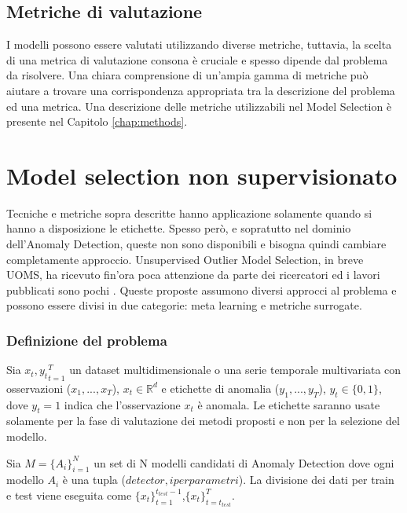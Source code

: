 \subsection{Metriche di valutazione}
I modelli possono essere valutati utilizzando diverse metriche, tuttavia, la scelta di una metrica di valutazione consona è cruciale e spesso dipende dal problema da risolvere. Una chiara comprensione di un'ampia gamma di metriche può aiutare a trovare una corrispondenza appropriata tra la descrizione del problema ed una metrica.
Una descrizione delle metriche utilizzabili nel Model Selection è presente nel Capitolo \ref{chap:methods}.

\section{Model selection non supervisionato}
Tecniche e metriche sopra descritte hanno applicazione solamente quando si hanno a disposizione le etichette. Spesso però, e sopratutto nel dominio dell'Anomaly Detection, queste non sono disponibili e bisogna quindi cambiare completamente approccio. 
Unsupervised Outlier Model Selection, in breve UOMS, ha ricevuto fin'ora poca attenzione da parte dei ricercatori ed i lavori pubblicati sono pochi  \cite{https://doi.org/10.48550/arxiv.2211.01834, https://doi.org/10.48550/arxiv.2210.01078, clei2022n,https://doi.org/10.48550/arxiv.1212.0960, https://doi.org/10.48550/arxiv.2009.10606, https://doi.org/10.48550/arxiv.2104.01422}. Queste proposte assumono diversi approcci al problema e possono essere divisi in due categorie: meta learning e metriche surrogate.

\subsubsection{Definizione del problema}
Sia \({x_t,y_t}^T_{t=1}\) un dataset multidimensionale o una serie temporale multivariata con osservazioni (\(x_1,...,x_T\)), \(x_t\in\mathbb{R}^d\) e etichette di anomalia (\(y_1,...,y_T\)), \(y_t \in \{0,1\}\), dove \(y_t=1\) indica che l'osservazione \(x_t\) è anomala. Le etichette saranno usate solamente per la fase di valutazione dei metodi proposti e non per la selezione del modello.

Sia \(M=\{A_i\}^N_{i=1}\) un set di N modelli candidati di Anomaly Detection dove ogni modello \(A_i\) è una tupla (\(detector, iperparametri\)).
La divisione dei dati per train e test viene eseguita come \(\{x_t\}_{t=1}^{t_{test}-1}\),\(\{x_t\}^{T}_{t=t_{test}}\).

